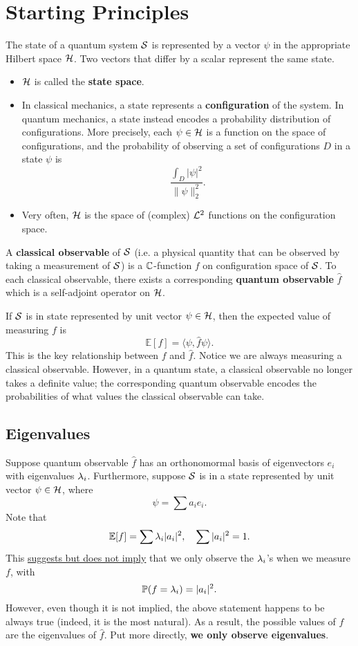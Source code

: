 \section{Starting Principles}

The state of a quantum system ${\mathcal S}$ is represented by a vector $\psi$ in the appropriate Hilbert space ${\mathcal H}$. Two vectors that differ by a scalar represent the same state.
\begin{itemize}
    \item ${\mathcal H}$ is called the \textbf{state space}.
    \item In classical mechanics, a state represents a \textbf{configuration} of the system. In quantum mechanics, a state instead encodes a probability distribution of configurations. More precisely, each $\psi \in {\mathcal H}$ is a function on the space of configurations, and the probability of observing a set of configurations $D$ in a state $\psi$ is
    \[
        \frac{\int_D |\psi|^2}{\|\psi\|_2^2}.
    \]
    \item Very often, ${\mathcal H}$ is the space of (complex) ${\mathcal L}^2$ functions on the configuration space.
\end{itemize}

A \textbf{classical observable} of ${\mathcal S}$ (i.e. a physical quantity that can be observed by taking a measurement of ${\mathcal S}$) is a ${\mathbb C}$-function $f$ on configuration space of ${\mathcal S}$. To each classical observable, there exists a corresponding \textbf{quantum observable} $\hat{f}$ which is a self-adjoint operator on ${\mathcal H}$.

If ${\mathcal S}$ is in state represented by unit vector $\psi \in {\mathcal H}$, then the expected value of measuring $f$ is
\[
    \mathbb E[f] = \langle \psi, \hat{f} \psi \rangle.
\]
This is the key relationship between $f$ and $\hat{f}$. Notice we are always measuring a classical observable. However, in a quantum state, a classical observable no longer takes a definite value; the corresponding quantum observable encodes the probabilities of what values the classical observable can take.

\subsection{Eigenvalues}

Suppose quantum observable $\hat{f}$ has an orthonomormal basis of eigenvectors $e_i$ with eigenvalues $\lambda_i$. Furthermore, suppose ${\mathcal S}$ is in a state represented by unit vector $\psi \in {\mathcal H}$, where
\[
    \psi = \sum a_i e_i.
\]
Note that
\[
    \mathbb E[f] = \sum \lambda_i |a_i|^2, \quad \sum |a_i|^2 = 1.
\]
This \underline{suggests but does not imply} that we only observe the $\lambda_i$'s when we measure $f$, with
\[
    \mathbb P(f = \lambda_i) = |a_i|^2.
\]
However, even though it is not implied, the above statement happens to be always true (indeed, it is the most natural). As a result, the possible values of $f$ are the eigenvalues of $\hat{f}$. Put more directly, \textbf{we only observe eigenvalues}.

